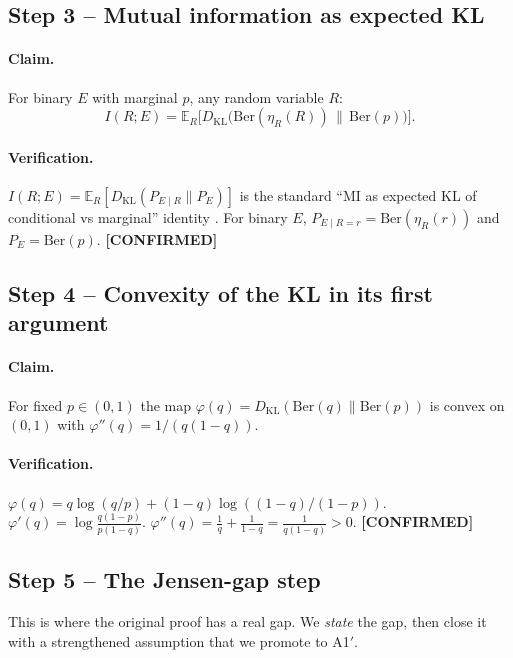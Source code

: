 \documentclass[11pt]{article}
\newcommand{\E}{\mathbb{E}}
\newcommand{\KL}{D_{\mathrm{KL}}}
\newcommand{\Ber}{\mathrm{Ber}}
\newcommand{\CONF}{{\color{black!60!green}\textbf{[CONFIRMED]}}}
\begin{document}
\subsection{Step 3 -- Mutual information as expected KL}

\paragraph{Claim.} For binary $E$ with marginal $p$, any random variable $R$:
\begin{equation}\label{eq:mi-as-kl-restate}
I(R;E)=\E_R\bigl[\KL\bigl(\Ber(\eta_R(R))\,\|\,\Ber(p)\bigr)\bigr].
\end{equation}

\paragraph{Verification.}
$I(R;E)=\E_R[\KL(P_{E\mid R}\|P_E)]$ is the standard ``MI as expected KL
of conditional vs marginal'' identity \citep[Eq.~2.28]{cover2006elements}.
For binary $E$, $P_{E\mid R=r}=\Ber(\eta_R(r))$ and $P_E=\Ber(p)$. \CONF

\subsection{Step 4 -- Convexity of the KL in its first argument}

\paragraph{Claim.} For fixed $p\in(0,1)$ the map
$\varphi(q)=\KL(\Ber(q)\|\Ber(p))$ is convex on $(0,1)$ with
$\varphi''(q)=1/(q(1-q))$.

\paragraph{Verification.}
$\varphi(q)=q\log(q/p)+(1-q)\log((1-q)/(1-p))$.
$\varphi'(q)=\log\frac{q(1-p)}{p(1-q)}$.
$\varphi''(q)=\frac{1}{q}+\frac{1}{1-q}=\frac{1}{q(1-q)}>0$. \CONF

\subsection{Step 5 -- The Jensen-gap step}

This is where the original proof has a real gap. We \emph{state} the
gap, then close it with a strengthened assumption that we promote to A1$'$.
\end{document}
